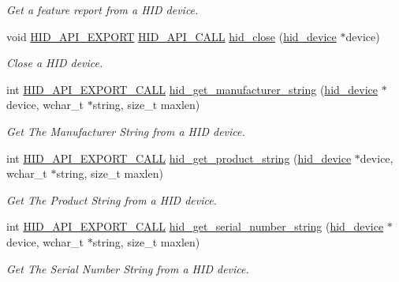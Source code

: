 \begin{DoxyCompactItemize}
\begin{DoxyCompactList}\small\item\em Get a feature report from a H\-I\-D device. \end{DoxyCompactList}\item 
void \hyperlink{osx_2hidapi_8h_aa60150016800ccb88fdf140e8553ae13}{H\-I\-D\-\_\-\-A\-P\-I\-\_\-\-E\-X\-P\-O\-R\-T} \hyperlink{osx_2hidapi_8h_af140a25716604e86096670a505a58ee0}{H\-I\-D\-\_\-\-A\-P\-I\-\_\-\-C\-A\-L\-L} \hyperlink{group__API_ga9b64828273b8dd052731e79ba9e1a516}{hid\-\_\-close} (\hyperlink{linux_2hidapi_8h_aa6da74d5686d198dd3e5440e60088fcc}{hid\-\_\-device} $\ast$device)
\begin{DoxyCompactList}\small\item\em Close a H\-I\-D device. \end{DoxyCompactList}\item 
int \hyperlink{osx_2hidapi_8h_a70c49eda5025c1bc455af77da19ca312}{H\-I\-D\-\_\-\-A\-P\-I\-\_\-\-E\-X\-P\-O\-R\-T\-\_\-\-C\-A\-L\-L} \hyperlink{group__API_ga2652b2ff0f3982a8c5791718e2a2e6cb}{hid\-\_\-get\-\_\-manufacturer\-\_\-string} (\hyperlink{linux_2hidapi_8h_aa6da74d5686d198dd3e5440e60088fcc}{hid\-\_\-device} $\ast$device, wchar\-\_\-t $\ast$string, size\-\_\-t maxlen)
\begin{DoxyCompactList}\small\item\em Get The Manufacturer String from a H\-I\-D device. \end{DoxyCompactList}\item 
int \hyperlink{osx_2hidapi_8h_a70c49eda5025c1bc455af77da19ca312}{H\-I\-D\-\_\-\-A\-P\-I\-\_\-\-E\-X\-P\-O\-R\-T\-\_\-\-C\-A\-L\-L} \hyperlink{group__API_gaa78526041c4bb470b2c1ad9eb0791c5f}{hid\-\_\-get\-\_\-product\-\_\-string} (\hyperlink{linux_2hidapi_8h_aa6da74d5686d198dd3e5440e60088fcc}{hid\-\_\-device} $\ast$device, wchar\-\_\-t $\ast$string, size\-\_\-t maxlen)
\begin{DoxyCompactList}\small\item\em Get The Product String from a H\-I\-D device. \end{DoxyCompactList}\item 
int \hyperlink{osx_2hidapi_8h_a70c49eda5025c1bc455af77da19ca312}{H\-I\-D\-\_\-\-A\-P\-I\-\_\-\-E\-X\-P\-O\-R\-T\-\_\-\-C\-A\-L\-L} \hyperlink{group__API_ga73994b7820264d3604d6ee25de9c66be}{hid\-\_\-get\-\_\-serial\-\_\-number\-\_\-string} (\hyperlink{linux_2hidapi_8h_aa6da74d5686d198dd3e5440e60088fcc}{hid\-\_\-device} $\ast$device, wchar\-\_\-t $\ast$string, size\-\_\-t maxlen)
\begin{DoxyCompactList}\small\item\em Get The Serial Number String from a H\-I\-D device. \end{DoxyCompactList}\item 

\end{DoxyCompactItemize}

